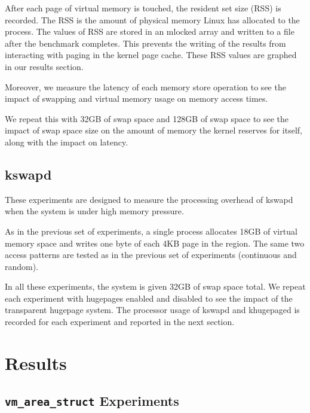 \documentclass[twocolumn,11pt]{article}
\begin{document}
After each page of virtual memory is touched, the resident set size (RSS) is
recorded. The RSS is the
amount of physical memory Linux has allocated to the process. The
values of RSS are stored in an mlocked array and written to a file after the
benchmark completes. This prevents the writing of the results from interacting
with paging in the kernel page cache. These RSS values are graphed in our
results section.

Moreover, we measure the latency of each memory store operation to see the
impact of swapping and virtual memory usage on memory access times.

We repeat this with 32GB of swap space and 128GB of swap space to see the
impact of swap space size on the amount of memory the kernel reserves for
itself, along with the impact on latency.

\subsection{kswapd}

These experiments are designed to measure the processing overhead of kswapd when
the system is under high memory pressure.

As in the previous set of experiments, a single process allocates 18GB of virtual memory space and writes one byte of
each 4KB page in the region. The same two access patterns are tested as in the
previous set of experiments (continuous and random).

In all these experiments, the system is given 32GB of swap space total. We
repeat each experiment with hugepages enabled and disabled to see the impact of
the transparent hugepage system. The processor usage of kswapd and khugepaged is
recorded for each experiment and reported in the next section.


\section{Results}

\subsection{\texttt{vm\_area\_struct} Experiments}
\end{document}
